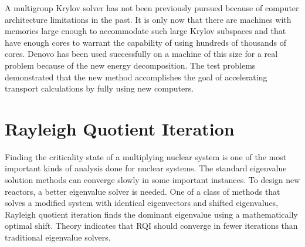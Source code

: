 


A multigroup Krylov solver has not been previously pursued because of computer architecture limitations in the past. It is only now that there are machines with memories large enough to accommodate such large Krylov subspaces and that have enough cores to warrant the capability of using hundreds of thousands of cores. Denovo has been used successfully on a machine of this size for a real problem because of the new energy decomposition. The test problems demonstrated that the new method accomplishes the goal of accelerating transport calculations by fully using new computers.

\section{Rayleigh Quotient Iteration}
Finding the criticality state of a multiplying nuclear system is one of the most important kinds of analysis done for nuclear systems. The standard eigenvalue solution methods can converge slowly in some important instances. To design new reactors, a better eigenvalue solver is needed. One of a class of methods that solves a modified system with identical eigenvectors and shifted eigenvalues, Rayleigh quotient iteration finds the dominant eigenvalue using a mathematically optimal shift. Theory indicates that RQI should converge in fewer iterations than traditional eigenvalue solvers.

